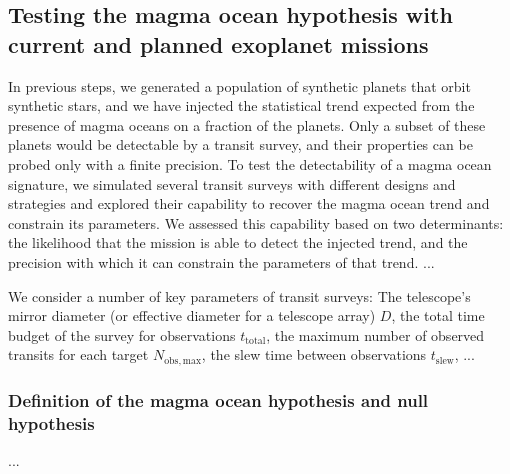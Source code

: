 \documentclass[modern]{aastex631}
\begin{document}
\subsection{Testing the magma ocean hypothesis with current and planned exoplanet missions}
\begin{note}
    In previous steps, we generated a population of synthetic planets that orbit synthetic stars, and we have injected the statistical trend expected from the presence of magma oceans on a fraction of the planets.
    Only a subset of these planets would be detectable by a transit survey, and their properties can be probed only with a finite precision.
    To test the detectability of a magma ocean signature, we simulated several transit surveys with different designs and strategies and explored their capability to recover the magma ocean trend and constrain its parameters.
    We assessed this capability based on two determinants: the likelihood that the mission is able to detect the injected trend, and the precision with which it can constrain the parameters of that trend.
    ...

    We consider a number of key parameters of transit surveys: The telescope's mirror diameter (or effective diameter for a telescope array) $D$, the total time budget of the survey for observations $t_\mathrm{total}$, the maximum number of observed transits for each target $N_\mathrm{obs, max}$, the slew time between observations $t_\mathrm{slew}$, ... 

\end{note}





\subsubsection{Definition of the magma ocean hypothesis and null hypothesis}
...
\end{document}
